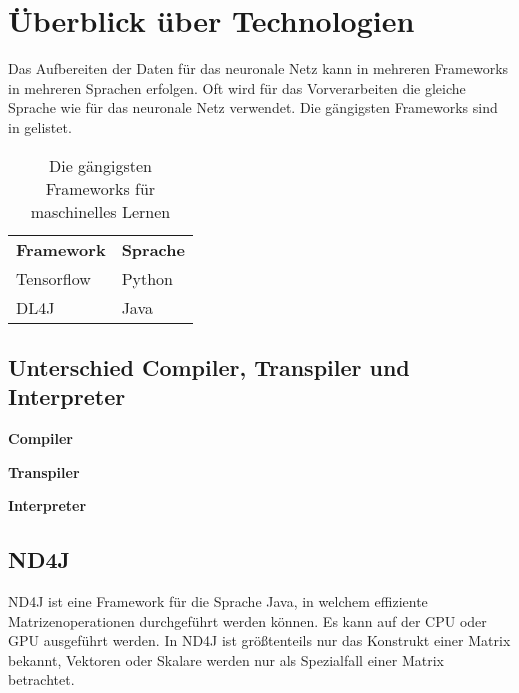 
\chapter{Überblick über Technologien}

Das Aufbereiten der Daten für das neuronale Netz kann in mehreren Frameworks in mehreren Sprachen erfolgen.
Oft wird für das Vorverarbeiten die gleiche Sprache wie für das neuronale Netz verwendet.
Die gängigsten Frameworks sind in  gelistet.

\begin{table}[H]
	\centering
	\begin{tabular}{ | p{3cm} | p{3cm} | }
		\hline \rowcolor{gray!15}
		\textbf{Framework} & \textbf{Sprache} \\ \hhline{|=|=|}
		Tensorflow & Python \\ \hline
		DL4J & Java \\ \hline
	\end{tabular}
	\caption{Die gängigsten Frameworks für maschinelles Lernen}
	\label{tab:Frameworks}
\end{table}

\section{Unterschied Compiler, Transpiler und Interpreter}
\begin{description}
	\item{\textbf{Compiler}}
	\item{\textbf{Transpiler}}
	\item{\textbf{Interpreter}}
\end{description}

\section{ND4J}
ND4J ist eine Framework für die Sprache Java, in welchem effiziente Matrizenoperationen durchgeführt werden können.
Es kann auf der \ac{CPU} oder \ac{GPU} ausgeführt werden.
In ND4J ist größtenteils nur das Konstrukt einer Matrix bekannt, Vektoren oder Skalare werden nur als Spezialfall einer Matrix betrachtet.

\endinput
